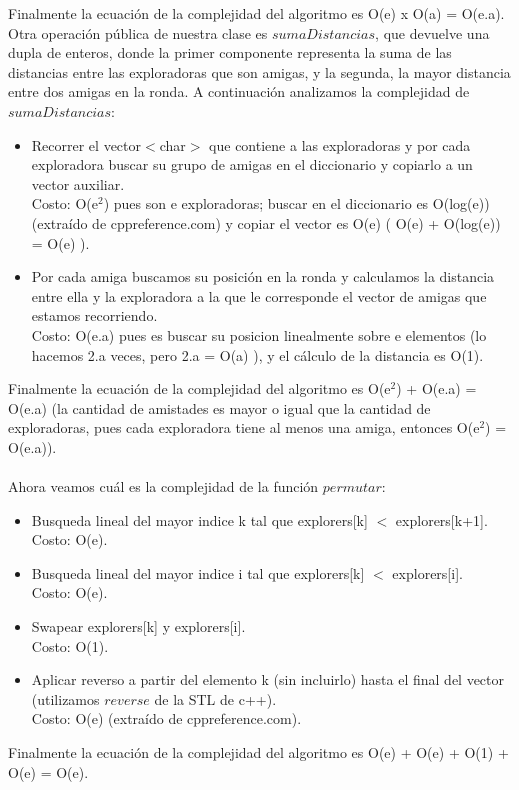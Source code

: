 Finalmente la ecuación de la complejidad del algoritmo es O(e) x O(a) = O(e.a). \\
Otra operación pública de nuestra clase es $sumaDistancias$, que devuelve una dupla de enteros, donde la primer componente 
representa la suma de las distancias entre las exploradoras que son amigas, y la segunda, la mayor distancia entre dos amigas en 
la ronda. A continuación analizamos la complejidad de $sumaDistancias$: 
\begin{itemize}
\item Recorrer el vector$<$char$>$ que contiene a las exploradoras y por cada exploradora buscar su grupo de amigas en el diccionario 
y copiarlo a un vector auxiliar.\\
Costo: O(e$^2$) pues son e exploradoras; buscar en el diccionario es O(log(e))(extraído de cppreference.com) y copiar el vector es O(e) ( 
O(e) + O(log(e)) = O(e) ).
\item Por cada amiga buscamos su posición en la ronda y calculamos la distancia entre ella y la exploradora a la que le corresponde el 
vector de amigas que estamos recorriendo. \\
Costo: O(e.a) pues es buscar su posicion linealmente sobre e elementos (lo hacemos 2.a veces, pero 2.a = O(a) ), y el cálculo de la distancia es O(1).
\end{itemize}
Finalmente la ecuación de la complejidad del algoritmo es O(e$^2$) + O(e.a) = O(e.a) (la cantidad de amistades es mayor o igual que la cantidad de exploradoras, pues cada exploradora tiene al menos una amiga, entonces O(e$^2$) = O(e.a)). \\
\\
Ahora veamos cuál es la complejidad de la función $permutar$:
\begin{itemize}
\item Busqueda lineal del mayor indice k tal que explorers[k] $<$ explorers[k+1]. \\
Costo: O(e).
\item Busqueda lineal del mayor indice i tal que explorers[k] $<$ explorers[i]. \\
Costo: O(e).
\item Swapear explorers[k] y explorers[i]. \\
Costo: O(1).
\item Aplicar reverso a partir del elemento k (sin incluirlo) hasta el final del vector (utilizamos $reverse$ de la STL de c++). \\
Costo: O(e) (extraído de cppreference.com).
\end{itemize}
Finalmente la ecuación de la complejidad del algoritmo es O(e) + O(e) + O(1) + O(e) = O(e).
\\

